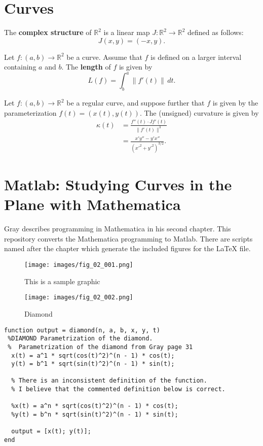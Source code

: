 \documentclass{book}
\begin{document}
	\chapter{Curves}
	
		The \textbf{complex structure} of $\mathbb{R}^2$ is a linear map $J:\mathbb{R}^2\rightarrow\mathbb{R}^2$ defined as follows:
		\begin{equation}
			J(x,y)=(-x,y)\mathrm{.}
		\end{equation} 
		
		Let $f:(a,b)\rightarrow\mathbb{R}^2$ be a curve. Assume that $f$ is defined on a larger interval containing $a$ and $b$. The \textbf{length} of $f$ is given by
		\begin{equation}
			L(f)=\int^a_b{\|f'(t)\|\,dt}\mathrm{.}
		\end{equation}
		
		Let $f:(a,b)\rightarrow\mathbb{R}^2$ be a regular curve, and suppose further that $f$ is given by the parameterization $f(t)=(x(t),y(t))$. The (unsigned) curvature is given by
		\begin{align}
			\kappa(t)&=\frac{f''(t)\cdot Jf'(t)}{\|f'(t)\|^3}\\
			&=\frac{x'y''-y'x''}{(x'^2+y'^2)^{3/2}}\mathrm{.}
		\end{align}

	\chapter{Matlab: Studying Curves in the Plane with Mathematica}
		Gray describes programming in Mathematica in his second chapter. This repository converts the Mathematica programming to Matlab. There are scripts named after the chapter which generate the included figures for the LaTeX file.
		\begin{figure}
			\centering
			\texttt{[image: images/fig\_02\_001.png]}
			\caption{This is a sample graphic}
			\label{fig_2_1}
		\end{figure}
		
		\begin{figure}
			\centering
			\texttt{[image: images/fig\_02\_002.png]}
			\caption{Diamond}
			\label{fig_2_2}
		\end{figure}
		
\begin{small}
\begin{verbatim}
function output = diamond(n, a, b, x, y, t)
 %DIAMOND Parametrization of the diamond.
 %  Parametrization of the diamond from Gray page 31
  x(t) = a^1 * sqrt(cos(t)^2)^(n - 1) * cos(t);
  y(t) = b^1 * sqrt(sin(t)^2)^(n - 1) * sin(t);
  
  % There is an inconsistent definition of the function.
  % I believe that the commented definition below is correct.
  
  %x(t) = a^n * sqrt(cos(t)^2)^(n - 1) * cos(t);
  %y(t) = b^n * sqrt(sin(t)^2)^(n - 1) * sin(t);
  
  output = [x(t); y(t)];
end		
\end{verbatim}		
\end{small}		
		
\end{document}
